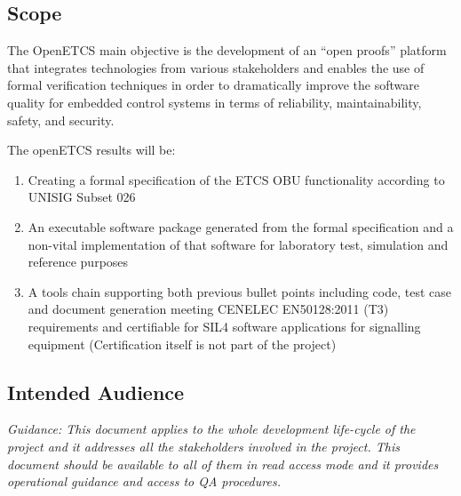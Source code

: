 \documentclass{template/openetcs_article}
\begin{document}
\subsection{Scope}

The OpenETCS main objective is the development of an ``open proofs'' platform that integrates technologies from various stakeholders and enables the use of formal verification techniques in order to dramatically improve the software quality for embedded control systems in terms of reliability, maintainability, safety, and security.



The openETCS results will be:
\begin{enumerate}
\item Creating a formal specification of the ETCS OBU functionality according to UNISIG Subset 026

\item An executable software package generated from the formal specification and a non-vital implementation of that software for laboratory test, simulation and reference purposes

\item A tools chain supporting both previous bullet points including code, test case and document generation meeting CENELEC EN50128:2011 (T3) requirements and certifiable for SIL4 software applications for signalling equipment (Certification itself is not part of the project)
\end{enumerate}



\subsection{Intended Audience}
\textit{Guidance: This document applies to the whole development life-cycle of the project and it addresses all the stakeholders involved in the project. This document should be available to all of them in read access mode and it provides operational guidance and access to QA procedures.}
\end{document}
